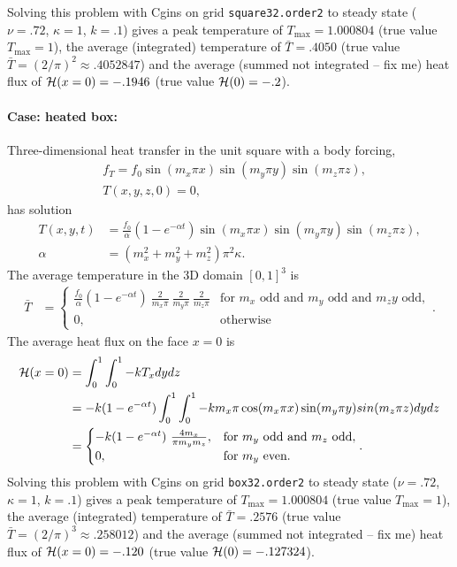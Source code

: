 Solving this problem with Cgins on grid {\tt square32.order2} to steady state ($\nu=.72$, $\kappa=1$, $k=.1$) gives a 
peak temperature of $T_{\max}=1.000804$ (true value $T_{\max}=1$), the average (integrated) temperature of $\bar{T}=.4050$ (true value 
$\bar{T}=(2/\pi)^2\approx .4052847$) and the average (summed not integrated -- fix me) heat flux of ${\mathcal H}(x=0)=-.1946$ (true value ${\mathcal H}(0)=-.2$).


\paragraph{Case: heated box:} Three-dimensional heat transfer in the unit square with a body forcing,
\begin{align}
  &  f_T = f_0 \sin(m_x\pi x)\sin(m_y \pi y)\sin(m_z \pi z)  , \\
  &  T(x,y,z,0) = 0 , 
\end{align}
has solution
\begin{align}
    T(x,y,t) &= \frac{f_0}{\alpha} ( 1 - e^{-\alpha t}) \sin(m_x\pi x)\sin(m_y \pi y)\sin(m_z \pi z)  , \\
    \alpha &= ( m_x^2 + m_y^2 + m_z^2) \pi^2 \kappa. 
\end{align}
The average temperature in the 3D domain $[0,1]^3$ is 
\begin{align}
    \bar{T} &=
  \begin{cases} 
   \frac{f_0}{\alpha} ( 1 - e^{-\alpha t}) ~ \frac{2}{m_x \pi}~ \frac{2}{m_y \pi}~ \frac{2}{m_z \pi} & 
                      \text{for $m_x$ odd and $m_y$ odd and $m_zy$ odd},\\
            0 , &  \text{otherwise} 
  \end{cases} .
\end{align}
The average heat flux on the face $x=0$ is
\begin{alignat}{3}
   {\mathcal H}(x=0) & = \int_0^1\int_0^1 -k T_x dy dz \\
            & = -k ( 1 - e^{-\alpha t}) \int_0^1 \int_0^1 -k m_x \pi \cos(m_x\pi x) \sin(m_y \pi y)sin(m_z \pi z) dy dz\\
       &= 
          \begin{cases} 
            - k( 1 - e^{-\alpha t}) ~ \frac{4 m_x}{\pi m_y m_z} , & \text{for $m_y$ odd and $m_z$ odd},\\
            0 , & \text{for $m_y$ even}.
          \end{cases} .
\end{alignat}
Solving this problem with Cgins on grid {\tt box32.order2} to steady state ($\nu=.72$, $\kappa=1$, $k=.1$) gives a 
peak temperature of $T_{\max}=1.000804$ (true value $T_{\max}=1$), the average (integrated) temperature of $\bar{T}=.2576$ (true value 
$\bar{T}=(2/\pi)^3\approx .258012$) and the average (summed not integrated -- fix me) heat flux of ${\mathcal H}(x=0)=-.120$ (true value ${\mathcal H}(0)=-.127324$).



